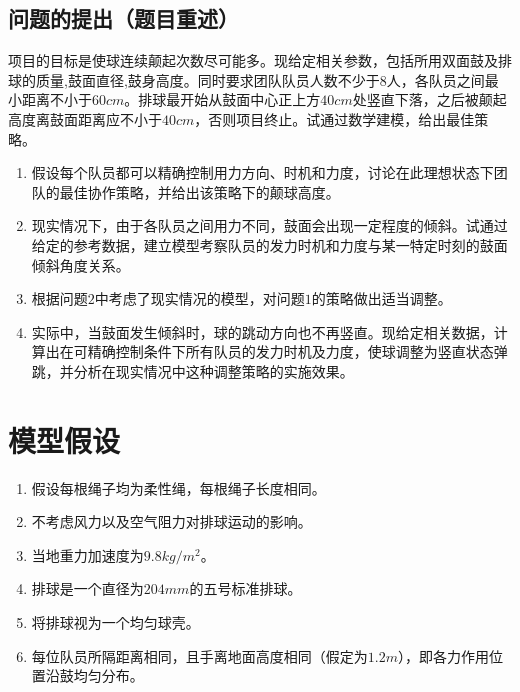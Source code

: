 \documentclass{cumcm}
\begin{document}
\subsection{问题的提出（题目重述）}
项目的目标是使球连续颠起次数尽可能多。现给定相关参数，包括所用双面鼓及排球的质量,鼓面直径,鼓身高度。同时要求团队队员人数不少于$8$人，各队员之间最小距离不小于$60cm$。排球最开始从鼓面中心正上方$40cm$处竖直下落，之后被颠起高度离鼓面距离应不小于$40cm$，否则项目终止。试通过数学建模，给出最佳策略。
\begin{enumerate}[(1)]
\item 假设每个队员都可以精确控制用力方向、时机和力度，讨论在此理想状态下团队的最佳协作策略，并给出该策略下的颠球高度。
\item 现实情况下，由于各队员之间用力不同，鼓面会出现一定程度的倾斜。试通过给定的参考数据，建立模型考察队员的发力时机和力度与某一特定时刻的鼓面倾斜角度关系。
\item 根据问题$2$中考虑了现实情况的模型，对问题$1$的策略做出适当调整。
\item 实际中，当鼓面发生倾斜时，球的跳动方向也不再竖直。现给定相关数据，计算出在可精确控制条件下所有队员的发力时机及力度，使球调整为竖直状态弹跳，并分析在现实情况中这种调整策略的实施效果。
\end{enumerate}

\section{模型假设}
\begin{enumerate}
\item 假设每根绳子均为柔性绳，每根绳子长度相同。
\item 不考虑风力以及空气阻力对排球运动的影响。
\item 当地重力加速度为$9.8kg/m^2$。
\item 排球是一个直径为$204mm$的五号标准排球。
\item 将排球视为一个均匀球壳。
\item 每位队员所隔距离相同，且手离地面高度相同（假定为$1.2m$），即各力作用位置沿鼓均匀分布。
\end{enumerate}

\newpage
\end{document}
